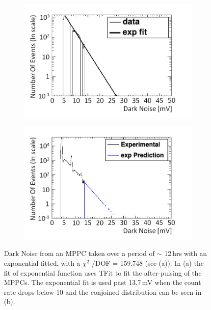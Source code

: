 \begin{figure}[!h]
\centering
\begin{subfigure}{.5\textwidth}
  \centering
  \includegraphics[width=\linewidth]{Chapter4/Figs/Raster/fit_of_dark_noiseMedText.png}
  \captionsetup{width=.9\linewidth}
  \caption{}
  \label{subFig:expFitOfDark}
\end{subfigure}%
\begin{subfigure}{.5\textwidth}
  \centering
  \includegraphics[width=\linewidth]{Chapter4/Figs/Raster/fittedDarkNoise_outputMedText.png}
  \captionsetup{width=.9\linewidth}
  \caption{}
  \label{subFig:fittedDarkNoise}
\end{subfigure}
\caption{Dark Noise from an MPPC taken over a period of $\sim$ 12\,hrs with an exponential fitted, with a $\chi ^2$ /DOF = 159.748 (see (a)). In (a) the fit of exponential function uses TFit to fit the after-pulsing of the MPPCs. The exponential fit is used past 13.7\,mV when the count rate drops below 10 and the conjoined distribution can be seen in (b).}
\label{fig:fitting_of_non_peak_dark_noise}
\end{figure}

